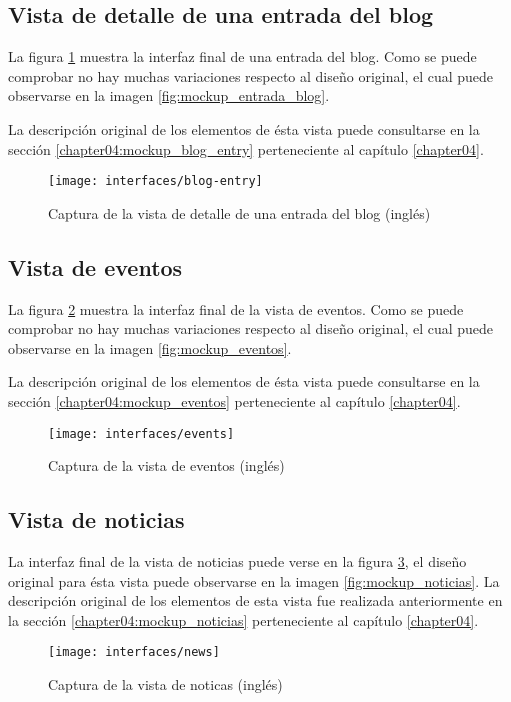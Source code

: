 \subsection{Vista de detalle de una entrada del blog}
La figura \ref{fig:interface_blog_entry} muestra la interfaz final de una entrada del blog.  Como se puede comprobar no hay muchas variaciones respecto al diseño original, el cual puede observarse en la imagen \ref{fig:mockup_entrada_blog}.

La descripción original de los elementos de ésta vista puede consultarse en la sección \ref{chapter04:mockup_blog_entry} perteneciente al capítulo \ref{chapter04}.

\begin{figure}[h]
	\centering
	\texttt{[image: interfaces/blog-entry]}
	\caption{Captura de la vista de detalle de una entrada del blog (inglés)}
	\label{fig:interface_blog_entry}
\end{figure}

\subsection{Vista de eventos}
La figura \ref{fig:interface_eventos} muestra la interfaz final de la vista de eventos.  Como se puede comprobar no hay muchas variaciones respecto al diseño original, el cual puede observarse en la imagen \ref{fig:mockup_eventos}.

La descripción original de los elementos de ésta vista puede consultarse en la sección \ref{chapter04:mockup_eventos} perteneciente al capítulo \ref{chapter04}.

\begin{figure}[h]
	\centering
	\texttt{[image: interfaces/events]}
	\caption{Captura de la vista de eventos (inglés)}
	\label{fig:interface_eventos}
\end{figure}


\subsection{Vista de noticias}
La interfaz final de la vista de noticias puede verse en la figura \ref{fig:interface_noticias}, el diseño original para ésta vista puede observarse en la imagen \ref{fig:mockup_noticias}.  La descripción original de los elementos de esta vista fue realizada anteriormente en la sección  \ref{chapter04:mockup_noticias} perteneciente al capítulo \ref{chapter04}.

\begin{figure}[h]
	\centering
	\texttt{[image: interfaces/news]}
	\caption{Captura de la vista de noticas (inglés)}
	\label{fig:interface_noticias}
\end{figure}


